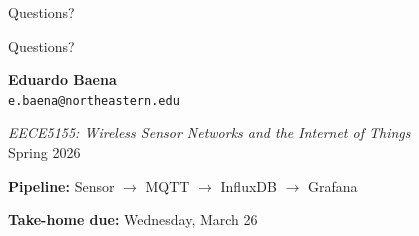 \documentclass[aspectratio=169,11pt]{beamer}
\begin{document}
\begin{frame}{Questions?}
    \begin{center}
        \Huge Questions?

        \vspace{0.8cm}
        \normalsize
        \textbf{Eduardo Baena}\\
        \texttt{e.baena@northeastern.edu}

        \vspace{0.5cm}
        \textit{EECE5155: Wireless Sensor Networks and the Internet of Things}\\
        Spring 2026

        \vspace{0.5cm}
        \textbf{Pipeline:} Sensor $\rightarrow$ MQTT $\rightarrow$ InfluxDB $\rightarrow$ Grafana

        \vspace{0.3cm}
        {\small \textbf{Take-home due:} Wednesday, March 26}
    \end{center}
\end{frame}
\end{document}
